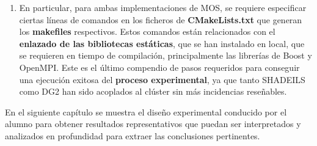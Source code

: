 \begin{enumerate}
	\item En particular, para ambas implementaciones de MOS, se requiere especificar ciertas líneas de comandos en los ficheros de \textbf{CMakeLists.txt} que generan los \textbf{makefiles} respectivos. Estos comandos están relacionados con el \textbf{enlazado de las bibliotecas estáticas}, que se han instalado en local, que se requieren en tiempo de compilación, principalmente las librerías de Boost y OpenMPI. Este es el último compendio de pasos requeridos para conseguir una ejecución exitosa del\textbf{ proceso experimental}, ya que tanto SHADEILS como DG2 han sido acoplados al clúster sin más incidencias reseñables.
\end{enumerate}

En el siguiente capítulo se muestra el diseño experimental conducido por el alumno para obtener resultados representativos que puedan ser interpretados y analizados en profundidad para extraer las conclusiones pertinentes. 













